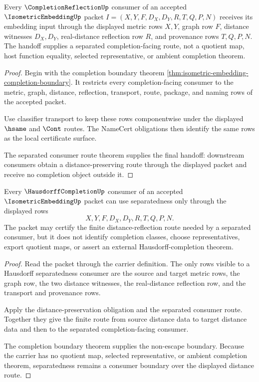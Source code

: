 \begin{theorem}
\label{thm:isometric-embedding-completion-reflection-handoff}
Every $\CompletionReflectionUp$ consumer of an accepted $\IsometricEmbeddingUp$ packet $I=(X,Y,F,D_X,D_Y,R,T,Q,P,N)$ receives its embedding input through the displayed metric rows $X,Y$, graph row $F$, distance witnesses $D_X,D_Y$, real-distance reflection row $R$, and provenance rows $T,Q,P,N$. The handoff supplies a separated completion-facing route, not a quotient map, host function equality, selected representative, or ambient completion theorem.
\end{theorem}
\begin{proof}
Begin with the completion boundary theorem \autoref{thm:isometric-embedding-completion-boundary}. It restricts every completion-facing consumer to the metric, graph, distance, reflection, transport, route, package, and naming rows of the accepted packet.

Use classifier transport to keep these rows componentwise under the displayed $\hsame$ and $\Cont$ routes. The NameCert obligations then identify the same rows as the local certificate surface.

The separated consumer route theorem supplies the final handoff: downstream consumers obtain a distance-preserving route through the displayed packet and receive no completion object outside it.
\end{proof}

\begin{theorem}
\label{thm:isometric-embedding-hausdorff-separation-boundary}
Every $\HausdorffCompletionUp$ consumer of an accepted $\IsometricEmbeddingUp$ packet can use separatedness only through the displayed rows
$$
X,Y,F,D_X,D_Y,R,T,Q,P,N.
$$
The packet may certify the finite distance-reflection route needed by a separated consumer, but it does not identify completion classes, choose representatives, export quotient maps, or assert an external Hausdorff-completion theorem.
\end{theorem}
\begin{proof}
Read the packet through the carrier definition. The only rows visible to a Hausdorff separatedness consumer are the source and target metric rows, the graph row, the two distance witnesses, the real-distance reflection row, and the transport and provenance rows.

Apply the distance-preservation obligation and the separated consumer route. Together they give the finite route from source distance data to target distance data and then to the separated completion-facing consumer.

The completion boundary theorem supplies the non-escape boundary. Because the carrier has no quotient map, selected representative, or ambient completion theorem, separatedness remains a consumer boundary over the displayed distance route.
\end{proof}

